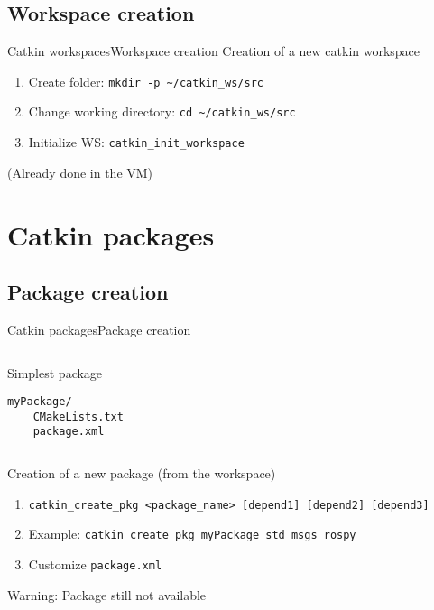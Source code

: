 \documentclass[10pt,compress]{beamer} %
\begin{document}
\subsection{Workspace creation}
\begin{frame}{Catkin workspaces}{Workspace creation}
	Creation of a new catkin workspace
	\begin{enumerate}
		\item Create folder: \texttt{mkdir -p \textasciitilde/catkin\_ws/src}
		\item Change working directory: \texttt{cd \textasciitilde/catkin\_ws/src}
		\item Initialize WS: \texttt{catkin\_init\_workspace}
  	\end{enumerate}

	(Already done in the VM)
\end{frame}

\section{Catkin packages}
\subsection{Package creation}
\begin{frame}[fragile]{Catkin packages}{Package creation}
	\vspace{-0.2cm}
    \begin{columns}
	   \begin{block}{Simplest package}
\begin{verbatim}
myPackage/
    CMakeLists.txt
    package.xml
\end{verbatim}
	   \end{block}
	\end{columns}
	\bigskip
	Creation of a new package (from the workspace)
	\begin{enumerate}
		\item \texttt{catkin\_create\_pkg <package\_name> [depend1] [depend2] [depend3]}
		\item[] Example: \texttt{catkin\_create\_pkg myPackage std\_msgs rospy}
		\item Customize \texttt{package.xml}
	\end{enumerate}
	Warning: Package still not available
\end{frame}
\end{document}
